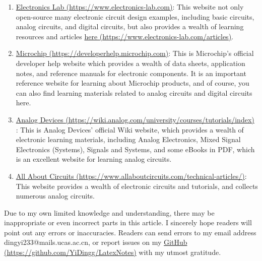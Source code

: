 \documentclass[UTF8]{report}
\begin{document}
\begin{enabstract}
\begin{enumerate}
    \item \href{https://www.electronics-lab.com}{  Electronics Lab  {\color{black} (https://www.electronics-lab.com)}}: This website not only open-source many electronic circuit design examples, including basic circuits, analog circuits, and digital circuits, but also provides a wealth of learning resources and articles \href{https://www.electronics-lab.com/articles/}{here {\color{black} (https://www.electronics-lab.com/articles)}}.

    \item \href{https://developerhelp.microchip.com}{  Microchip  {\color{black} (https://developerhelp.microchip.com)}}: This is Microchip's official developer help website which provides a wealth of data sheets, application notes, and reference manuals for electronic components. It is an important reference website for learning about Microchip products, and of course, you can also find learning materials related to analog circuits and digital circuits here. 
    
    \item \href{https://wiki.analog.com/university/courses/tutorials/index}{Analog Devices {\color{black}(https://wiki.analog.com/university/courses/tutorials/index)}} : This is Analog Devices' official Wiki website, which provides a wealth of electronic learning materials, including Analog Electronics, Mixed Signal Electronics (Systems), Signals and Systems, and some eBooks in PDF, which is an excellent website for learning analog circuits.

    \item \href{https://www.allaboutcircuits.com/technical-articles/}{  All About Circuits  {\color{black} (https://www.allaboutcircuits.com/technical-articles/)}}: This website provides a wealth of electronic circuits and tutorials, and collects numerous analog circuits.
\end{enumerate}
    
    Due to my own limited knowledge and understanding, there may be inappropriate or even incorrect parts in this article. I sincerely hope readers will point out any errors or inaccuracies. Readers can send errors to my email address {\color{blue} dingyi233@mails.ucas.ac.cn}, or report issues on my \href{https://github.com/YiDingg/LatexNotes}{GitHub {\color{black} (https://github.com/YiDingg/LatexNotes)}} with my utmost gratitude.
\end{enabstract}
\end{document}
